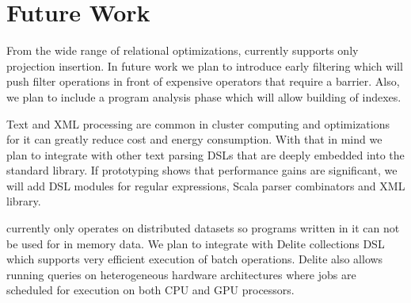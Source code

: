 \section{Future Work}
\label{sec:future-work}

From the wide range of relational optimizations, \tool currently supports only
 projection insertion. In future work we plan to introduce early filtering
 which will push filter operations in front of expensive operators that
 require a barrier. Also, we plan to include a program analysis phase which will
 allow building of indexes.

Text and XML processing are common in cluster computing and optimizations for
it can greatly reduce cost and energy consumption. With that in mind we plan to
integrate \tool with other text parsing DSLs that are deeply embedded into the
standard library. If prototyping shows that performance gains are significant,
we will add DSL modules for regular expressions, Scala parser combinators and XML library.

\tool currently only operates on distributed datasets so programs written in it
can not be used for in memory data. We plan to integrate \tool with Delite
\cite{brown_heterogeneous_2011} collections DSL which supports very efficient
execution of batch operations. Delite also allows running queries on
heterogeneous hardware architectures where jobs are scheduled for execution on
both CPU and GPU processors.
\\
